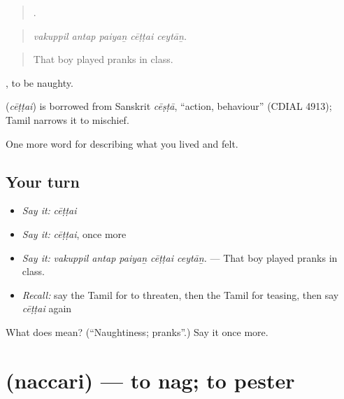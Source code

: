 \begin{quote}
    .
\end{quote}

\begin{quote}
\emph{vakuppil antap paiyaṉ cēṭṭai ceytāṉ.}
\end{quote}

\begin{quote}
That boy played pranks in class.
\end{quote}

 , to be naughty.

\begin{cousinweb}
\textbf{} (\emph{cēṭṭai}) is borrowed from Sanskrit \emph{cēṣṭā}, \textquotedblleft{}action, behaviour\textquotedblright{} (CDIAL 4913); Tamil narrows it to mischief.
\end{cousinweb}

\begin{grammarlens}[title={What you've built}]
One more word for describing what you lived and felt.
\end{grammarlens}

\subsection*{Your turn}
\begin{itemize}
\raggedright
  \item \emph{Say it:} \emph{cēṭṭai}
  \item \emph{Say it:} \emph{cēṭṭai}, once more
  \item \emph{Say it:} \emph{vakuppil antap paiyaṉ cēṭṭai ceytāṉ.} — That boy played pranks in class.
  \item \emph{Recall:} say the Tamil for to threaten, then the Tamil for teasing, then say \emph{cēṭṭai} again
\end{itemize}

\begin{tcolorbox}[breakable,colback=teal!4,colframe=teal!35!black,title={Before you move on}]
What does  mean? (\textquotedblleft{}Naughtiness; pranks\textquotedblright{}.) Say it once more.
\end{tcolorbox}
\section[\texorpdfstring{\ta{நச்சரி} (naccari)}{நச்சரி (naccari)}]{ (naccari) — to nag; to pester}

